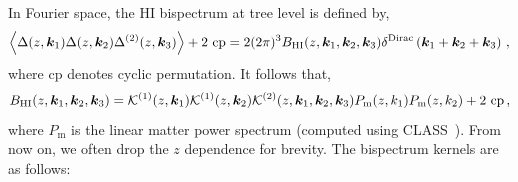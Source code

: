\vspace{0.2cm}
%
In Fourier space, the HI bispectrum at tree level is defined by,
\begin{equation}
\left\langle \Delta(z,\bm {k}_1)\Delta(z,\bm {k}_2)\Delta^{(2)}(z,\bm {k}_3) \right\rangle + \text{2 cp}=2 (2\pi)^3 B_{{\mathrm{HI}}}(z, \bm {k}_1, \bm {k}_2, \bm {k}_3) \delta^\mathrm{Dirac}\left(\bm {k}_1 + \bm {k}_2 + \bm {k}_3\right)\,, \label{e1.3}
\end{equation}
where cp denotes cyclic permutation. It follows that, 
\begin{equation}
B_{{\mathrm{HI}}}(z, \bm {k}_1,\bm {k}_2,\bm {k}_3) = \mathcal{K}^{(1)}(z, \bm {k}_1)\mathcal{K}^{(1)}(z, \bm {k}_2)\mathcal{K}^{(2)}(z, \bm {k}_1,\bm {k}_2,\bm {k}_3)P_\mathrm{m} (z, k_{1})P_\mathrm{m}(z, k_{2}) + \text{2 cp}\,, \label{e1.5}
\end{equation} 
where $P_\mathrm{m}$ is the linear matter power spectrum (computed using CLASS~\cite{Blas:2011rf}).  From now on, we often drop the $z$ dependence for brevity.  
The bispectrum kernels are as follows:
